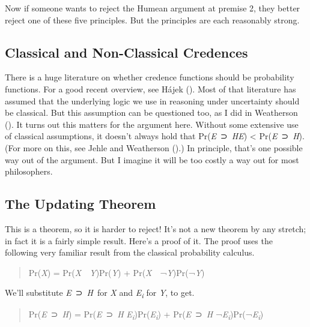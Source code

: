 \documentclass[
  11pt,
  letterpaper,
  DIV=11,
  numbers=noendperiod,
  twoside]{scrartcl}
\begin{document}
Now if someone wants to reject the Humean argument at premise 2, they
better reject one of these five principles. But the principles are each
reasonably strong.

\subsection{Classical and Non-Classical
Credences}\label{classical-and-non-classical-credences}

There is a huge literature on whether credence functions should be
probability functions. For a good recent overview, see Hájek
(). Most of that literature has assumed
that the underlying logic we use in reasoning under uncertainty should
be classical. But this assumption can be questioned too, as I did in
Weatherson (). It turns out this
matters for the argument here. Without some extensive use of classical
assumptions, it doesn't always hold that
Pr(\emph{E}~⊃~\emph{H}\textbar{}\emph{E}) \textless{}
Pr(\emph{E}~⊃~\emph{H}). (For more on this, see Jehle and Weatherson
().) In principle, that's one
possible way out of the argument. But I imagine it will be too costly a
way out for most philosophers.

\subsection{The Updating Theorem}\label{the-updating-theorem}

This is a theorem, so it is harder to reject! It's not a new theorem by
any stretch; in fact it is a fairly simple result. Here's a proof of it.
The proof uses the following very familiar result from the classical
probability calculus.

\begin{quote}
Pr(\emph{X}) = Pr(\emph{X}~\textbar~\emph{Y})Pr(\emph{Y}) +
Pr(\emph{X}~\textbar~¬\emph{Y})Pr(¬\emph{Y})
\end{quote}

We'll substitute \emph{E}~⊃~\emph{H}~for \emph{X} and
\emph{E\textsubscript{i}} for \emph{Y}, to get.

\begin{quote}
Pr(\emph{E}~⊃~\emph{H}) = Pr(\emph{E}~⊃~\emph{H}\textbar{}
\emph{E\textsubscript{i}})Pr(\emph{E\textsubscript{i}}) +
Pr(\emph{E}~⊃~\emph{H}\textbar{}
¬\emph{E\textsubscript{i}})Pr(¬\emph{E\textsubscript{i}})
\end{quote}
\end{document}
